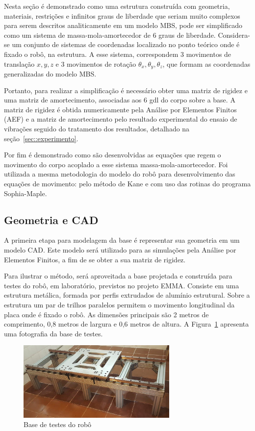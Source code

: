 Nesta seção é demonstrado como uma estrutura construída com geometria,
materiais, restrições e infinitos graus de liberdade que seriam muito complexos
para serem descritos analiticamente em um modelo MBS, pode ser simplificado como
um sistema de massa-mola-amortecedor de 6 graus de liberdade.
Considera-se um conjunto de sistemas de coordenadas localizado no ponto teórico
onde é fixado o robô, na estrutura. A esse sistema, correspondem 3 movimentos de
translação $x,y,z$ e 3 movimentos de rotação $\theta_x, \theta_y, \theta_z$, que
formam as coordenadas generalizadas do modelo MBS.

Portanto, para realizar a simplificação é necessário obter uma matriz de rigidez
e uma matriz de amortecimento, associadas aos 6 gdl do corpo sobre a base. A
matriz de rigidez é obtida numericamente pela Análise por Elementos Finitos
(AEF) e a matriz de amortecimento pelo resultado experimental do ensaio de
vibrações seguido do tratamento dos resultados, detalhado na
seção~\ref{sec::experimento}.

Por fim é demonstrado como são desenvolvidas as equações que regem o
movimento do corpo acoplado a esse sistema massa-mola-amortecedor.
Foi utilizada a mesma metodologia do modelo do robô para desenvolvimento das
equações de movimento: pelo método de Kane e com uso das rotinas do programa
Sophia-Maple.

\subsection{Geometria e CAD}

A primeira etapa para modelagem da base é representar sua geometria em um modelo
CAD. Este modelo será utilizado para as simulações pela Análise por Elementos
Finitos, a fim de se obter a sua matriz de rigidez.

Para ilustrar o método, será aproveitada a base projetada e construída para
testes do robô, em laboratório, previstos no projeto EMMA. Consiste em uma
estrutura metálica, formada por perfis extrudados de alumínio estrutural. Sobre
a estrutura um par de trilhos paralelos permitem o movimento longitudinal da
placa onde é fixado o robô. As dimensões principais são 2 metros de comprimento,
0,8 metros de largura e 0,6 metros de altura. A
Figura~\ref{fig::estrut_modelo_fisico} apresenta uma fotografia da base de
testes.

\begin{figure}[h]
	\centering 
 	\includegraphics[width=0.70\textwidth]{figs/estrut_modelo_fisico}
 	\caption{Base de testes do robô}
 	\label{fig::estrut_modelo_fisico}
\end{figure}

